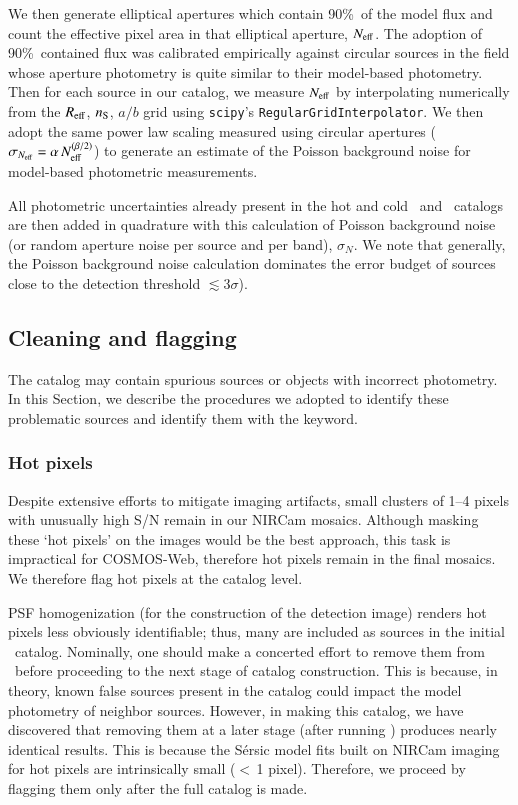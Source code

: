 \documentclass[longauth]{aa}
\begin{document}
We then generate elliptical apertures which contain 90\%\ of the model flux and count the effective pixel area in that elliptical aperture, $N_{\rm eff}$. The adoption of 90\%\ contained flux was calibrated empirically against circular sources in the field whose aperture photometry is quite similar to their model-based photometry.  Then for each source in our catalog, we measure $N_{\rm eff}$ by interpolating numerically from the $R_{\rm eff}$, $n_{\rm S}$, $a/b$ grid using \texttt{scipy}'s \texttt{RegularGridInterpolator}. We then adopt the same power law scaling measured using circular apertures ($\sigma_{N_{\rm eff}} = \alpha \, N_{\rm eff}^{(\beta/2)}$) to generate an estimate of the Poisson background noise for model-based photometric measurements. 

All photometric uncertainties already present in the hot and cold \ and \SEpp\ catalogs are then added in quadrature with this calculation of Poisson background noise (or random aperture noise per source and per band), $\sigma_N$. We note that generally, the Poisson background noise calculation dominates the error budget of sources close to the detection threshold $\lesssim$3$\sigma$). 




\subsection{Cleaning and flagging} \label{sec:cleaning-flagging}

The catalog may contain spurious sources or objects with incorrect photometry. In this Section, we describe the procedures we  adopted to identify these problematic sources and identify them with the \warnfl keyword. 

\subsubsection{Hot pixels} \label{sec:hot-pix}

Despite extensive efforts to mitigate imaging artifacts, small clusters of 1–4 pixels with unusually high S/N remain in our NIRCam mosaics. Although masking these `hot pixels' on the images would be the best approach, this task is impractical for COSMOS-Web, therefore hot pixels remain in the final mosaics. We therefore flag hot pixels at the catalog level.

PSF homogenization (for the construction of the detection image) renders hot pixels less obviously identifiable; thus, many are included as sources in the initial \hotcold\ catalog.  Nominally, one should make a concerted effort to remove them from \hotcold\ before proceeding to the next stage of catalog construction.  This is because, in theory, known false sources present in the catalog could impact the model photometry of neighbor sources.  However, in making this catalog, we have discovered that removing them at a later stage (after running \SEpp) produces nearly identical results. This is because the S\'ersic model fits built on NIRCam imaging for hot pixels are intrinsically small ($<$\,1 pixel).  Therefore, we proceed by flagging them only after the full catalog is made.
\end{document}
